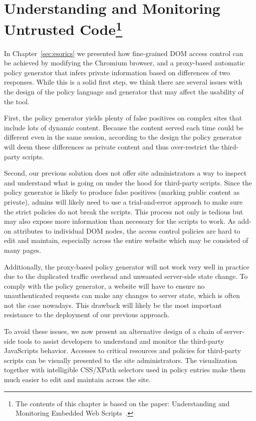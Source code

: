 \chapter[Understanding and Monitoring Untrusted Code]{Understanding and Monitoring Untrusted Code\footnote{The contents of this chapter is based on the paper: Understanding and Monitoring Embedded Web Scripts~\cite{FireInspector}.}}
\label{sec:fireinspector}

In Chapter~\ref{sec:esorics} we presented how fine-grained DOM access control can be achieved by modifying the Chromium browser, and a proxy-based automatic policy generator that infers private information based on differences of two responses.  While this is a solid first step, we think there are several issues with the design of the policy language and generator that may affect the usability of the tool.

First, the policy generator yields plenty of false positives on complex sites that include lots of dynamic content.  Because the content served each time could be different even in the same session, according to the design the policy generator will deem these differences as private content and thus over-restrict the third-party scripts.

Second, our previous solution does not offer site administrators a way to inspect and understand what is going on under the hood for third-party scripts.  Since the policy generator is likely to produce false positives (marking public content as private), admins will likely need to use a trial-and-error approach to make sure the strict policies do not break the scripts.  This process not only is tedious but may also expose more information than necessary for the scripts to work.  As add-on attributes to individual DOM nodes, the access control policies are hard to edit and maintain, especially across the entire website which may be consisted of many pages.  

Additionally, the proxy-based policy generator will not work very well in practice due to the duplicated traffic overhead and unwanted server-side state change.  To comply with the policy generator, a website will have to ensure no unauthenticated requests can make any changes to server state, which is often not the case nowadays.  This drawback will likely be the most important resistance to the deployment of our previous approach.

To avoid these issues, we now present an alternative design of a chain of server-side tools to assist developers to understand and monitor the third-party JavaScripts behavior.  Accesses to critical resources and policies for third-party scripts can be visually presented to the site administrators.  The visualization together with intelligible CSS/XPath selectors used in policy entries make them much easier to edit and maintain across the site.

